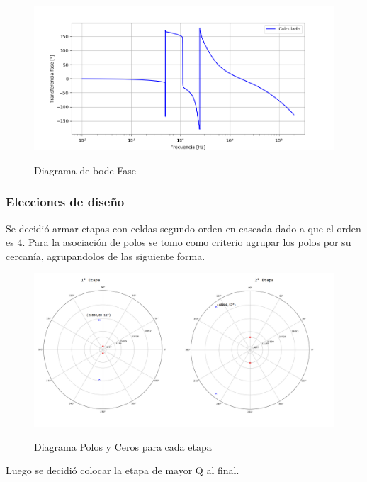 \begin{figure}[H]
	\centering
	\includegraphics[width=\textwidth]{Imagenes-Ej3/BodeFaseCalc.png}
	\label{fig:BodeCalcF}
	\caption{Diagrama de bode Fase}
\end{figure}
\subsubsection{Elecciones de diseño}
Se decidió armar etapas con celdas segundo orden en cascada dado a que el orden es 4.
Para la asociación de polos se tomo como criterio agrupar los polos por su cercanía, agrupandolos de las siguiente forma.

\begin{figure}[H]
	\centering
	\includegraphics[width=\textwidth]{Imagenes-Ej3/UnionCeros.png}
	\label{fig:CeroPoleUnion}
	\caption{Diagrama Polos y Ceros para cada etapa}
\end{figure}

Luego se decidió colocar la etapa de mayor Q al final.


